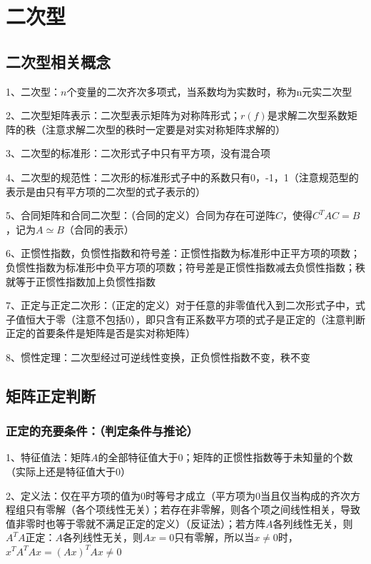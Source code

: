 \chapter{二次型}

\section{二次型相关概念}

1、二次型：$n$个变量的二次齐次多项式，当系数均为实数时，称为n元实二次型

2、二次型矩阵表示：二次型表示矩阵为对称阵形式；$r(f)$是求解二次型系数矩阵的秩（注意求解二次型的秩时一定要是对实对称矩阵求解的）

3、二次型的标准形：二次形式子中只有平方项，没有混合项

4、二次型的规范性：二次形的标准形式子中的系数只有0，-1，1（注意规范型的表示是由只有平方项的二次型的式子表示的）

5、合同矩阵和合同二次型：（合同的定义）合同为存在可逆阵$C$，使得$C^TAC=B$，记为$A \simeq B$（合同的表示）

6、正惯性指数，负惯性指数和符号差：正惯性指数为标准形中正平方项的项数；负惯性指数为标准形中负平方项的项数；符号差是正惯性指数减去负惯性指数；秩就等于正惯性指数加上负惯性指数

7、正定与正定二次形：（正定的定义）对于任意的非零值代入到二次形式子中，式子值恒大于零（注意不包括0），即只含有正系数平方项的式子是正定的（注意判断正定的首要条件是矩阵是否是实对称矩阵）

8、惯性定理：二次型经过可逆线性变换，正负惯性指数不变，秩不变

\section{矩阵正定判断}



\subsection{正定的充要条件：（判定条件与推论）}

1、特征值法：矩阵$A$的全部特征值大于0；矩阵的正惯性指数等于未知量的个数（实际上还是特征值大于0）

2、定义法：仅在平方项的值为0时等号才成立（平方项为0当且仅当构成的齐次方程组只有零解（各个项线性无关）；若存在非零解，则各个项之间线性相关，导致值非零时也等于零就不满足正定的定义）（反证法）；若方阵$A$各列线性无关，则$A^TA$正定：$A$各列线性无关，则$Ax=0$只有零解，所以当$x\ne 0$时，$x^TA^TAx = (Ax)^TAx \ne 0$


